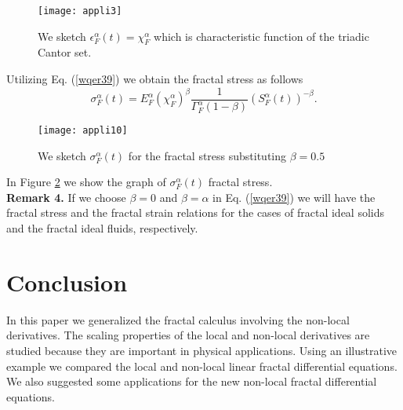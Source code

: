 \documentclass[12pt]{article}
\begin{document}
\begin{figure}[H]
  \centering
  \texttt{[image: appli3]}
  \caption{We sketch  $ \epsilon_{F}^{\alpha}(t)=\chi_{F}^{\alpha}$ which is characteristic function of the triadic Cantor set. }\label{751zswaq67b}
\end{figure}
Utilizing Eq. (\ref{wqer39}) we obtain the  fractal stress as follows
\begin{equation}\label{olp}
  \sigma_{F}^{\alpha}(t)=E_{F}^{\alpha} (\chi_{F}^{\alpha})^{\beta}\frac{1}
{\Gamma^{\alpha}_{F}(1-\beta)}(S_{F}^{\alpha}(t))^{-\beta}.
\end{equation}
\begin{figure}[H]
  \centering
  \texttt{[image: appli10]}
  \caption{We sketch $\sigma_{F}^{\alpha}(t)$ for the fractal stress substituting  $\beta=0.5$ }\label{751zkilujswaq67b}
\end{figure}
In Figure \ref{751zkilujswaq67b} we show the graph of $\sigma_{F}^{\alpha}(t)$ fractal stress.\\
\textbf{Remark 4.}  If we choose $\beta=0$ and $\beta=\alpha$ in Eq. (\ref{wqer39}) we will  have the fractal stress and  the fractal strain relations for the cases of fractal ideal solids and  the fractal ideal fluids, respectively.
\section{ Conclusion \label{7-sec}}
In this paper we generalized the fractal calculus involving the non-local derivatives. The scaling properties of the local and non-local derivatives are studied  because they are important in   physical applications. Using an illustrative example we compared the local and non-local linear fractal differential equations. We also suggested  some applications for the new non-local fractal differential equations.
\end{document}
